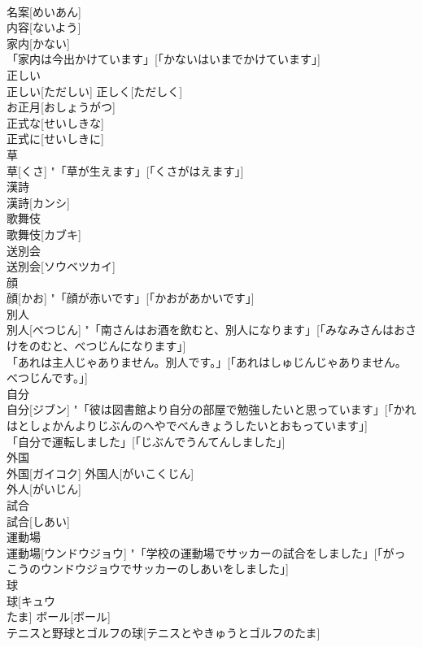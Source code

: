\documentclass[8pt]{extreport}
\begin{document}
\begin{CJK}{UTF8}{min}
\\	名案[めいあん] 
\\	内容[ないよう] 
\\	家内[かない] 
\\	「家内は今出かけています」[「かないはいまでかけています」] 
\\	正しい	
\\	正しい[ただしい]	正しく[ただしく] 
\\	お正月[おしょうがつ] 
\\	正式な[せいしきな] 
\\	正式に[せいしきに] 
\\	草	
\\	草[くさ]	"「草が生えます」[「くさがはえます」] 
\\	漢詩	
\\	漢詩[カンシ]	
\\	歌舞伎	
\\	歌舞伎[カブキ]	
\\	送別会	
\\	送別会[ソウベツカイ]	
\\	顔	
\\	顔[かお]	"「顔が赤いです」[「かおがあかいです」] 
\\	別人	
\\	別人[べつじん]	"「南さんはお酒を飲むと、別人になります」[「みなみさんはおさけをのむと、べつじんになります」] 
\\	「あれは主人じゃありません。別人です。」[「あれはしゅじんじゃありません。べつじんです。」] 
\\	自分	
\\	自分[ジブン]	"「彼は図書館より自分の部屋で勉強したいと思っています」[「かれはとしょかんよりじぶんのへやでべんきょうしたいとおもっています」] 
\\	「自分で運転しました」[「じぶんでうんてんしました」] 
\\	外国	
\\	外国[ガイコク]	外国人[がいこくじん] 
\\	外人[がいじん] 
\\	試合	
\\	試合[しあい]	
\\	運動場	
\\	運動場[ウンドウジョウ]	"「学校の運動場でサッカーの試合をしました」[「がっこうのウンドウジョウでサッカーのしあいをしました」] 
\\	球	
\\	球[キュウ 
\\	たま]	ボール[ボール] 
\\	テニスと野球とゴルフの球[テニスとやきゅうとゴルフのたま] 

\end{CJK}
\end{document}
